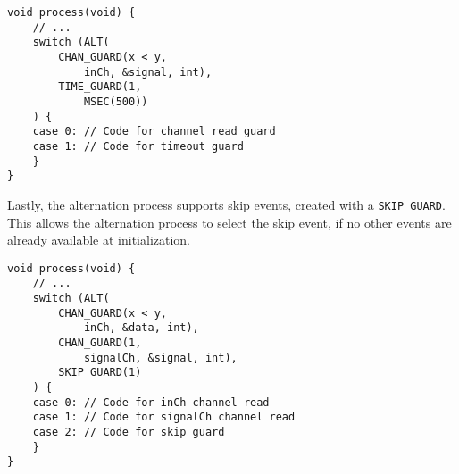\begin{lstlisting}[style={CustomC},caption={Alternation construct with timeout}]
void process(void) {
    // ...
    switch (ALT(
        CHAN_GUARD(x < y, 
            inCh, &signal, int),
        TIME_GUARD(1,
            MSEC(500))
    ) {
    case 0: // Code for channel read guard 
    case 1: // Code for timeout guard
    }
}
\end{lstlisting}

Lastly, the alternation process supports skip events, created with a \texttt{SKIP\_GUARD}. This allows the alternation process to select the skip event, if no other events are already available at initialization. 

\begin{lstlisting}[style={CustomC},caption={Alternation construct with skip}]
void process(void) {
    // ...
    switch (ALT(
        CHAN_GUARD(x < y, 
            inCh, &data, int),
        CHAN_GUARD(1, 
            signalCh, &signal, int),
        SKIP_GUARD(1)
    ) {
    case 0: // Code for inCh channel read 
    case 1: // Code for signalCh channel read
    case 2: // Code for skip guard
    }
}
\end{lstlisting}

